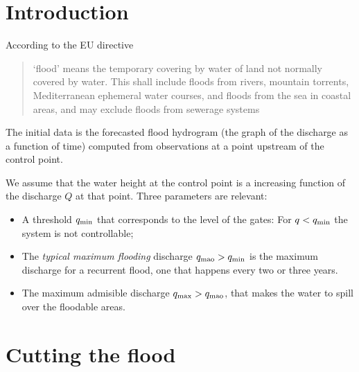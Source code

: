\def\Qsub#1{q_{\mbox{\scriptsize #1}}}
\def\qf{\Qsub{f}}
\def\qmao{\Qsub{mao}}
\def\qmax{\Qsub{max}}
\def\qi{\Qsub{i}}
\def\qmin{\Qsub{min}}



\section{Introduction}

According to the EU directive \cite{eurlex}
\begin{quote}
\textquoteleft{}flood\textquoteright{} means the temporary covering
by water of land not normally covered by water. This shall include
floods from rivers, mountain torrents, Mediterranean ephemeral water
courses, and floods from the sea in coastal areas, and may exclude
floods from sewerage systems 
\end{quote}
The initial data is the forecasted flood hydrogram (the graph of the
discharge as a function of time) computed from observations at a point
upstream of the control point. 

We assume that the water height at the control point is a increasing
function of the discharge $Q$ at that point. Three parameters are
relevant:
\begin{itemize}
\item A threshold $\qmin$ that corresponds to the level of the gates: For
$q<\qmin$ the system is not controllable;
\item The \emph{typical maximum flooding} discharge $\qmao>\qmin$ is the
maximum discharge for a recurrent flood, one that happens every two
or three years. 
\item The maximum admisible discharge $\qmax>\qmao$, that makes the water
to spill over the floodable areas.
\end{itemize}

\section{Cutting the flood}

